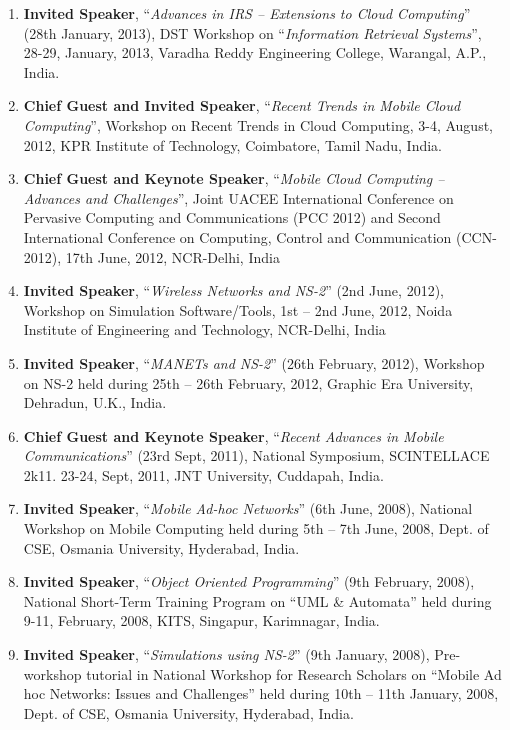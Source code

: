 \begin{enumerate} [label=(T\arabic*).]
\item
\textbf{Invited Speaker}, “\textit{Advances in IRS – Extensions to Cloud Computing}” (28th January, 2013), DST Workshop on “\textit{Information Retrieval Systems}”, 28-29, January, 2013, Varadha Reddy Engineering College, Warangal, A.P., India.

\item
\textbf{Chief Guest and Invited Speaker}, “\textit{Recent Trends in Mobile Cloud Computing}”, Workshop on Recent Trends in Cloud Computing, 3-4, August, 2012, KPR Institute of Technology, Coimbatore, Tamil Nadu, India.

\item
\textbf{Chief Guest and Keynote Speaker}, “\textit{Mobile Cloud Computing – Advances and Challenges}”, Joint UACEE International Conference on Pervasive Computing and Communications (PCC 2012) and Second International Conference on Computing, Control and Communication (CCN-2012), 17th June, 2012, NCR-Delhi, India

\item
\textbf{Invited Speaker}, “\textit{Wireless Networks and NS-2}” (2nd June, 2012), Workshop on Simulation Software/Tools, 1st – 2nd June, 2012, Noida Institute of Engineering and Technology, NCR-Delhi, India

\item
\textbf{Invited Speaker}, “\textit{MANETs and NS-2}” (26th February, 2012), Workshop on NS-2 held during 25th – 26th February, 2012, Graphic Era University, Dehradun, U.K., India.

\item
\textbf{Chief Guest and Keynote Speaker}, “\textit{Recent Advances in Mobile Communications}” (23rd Sept, 2011), National Symposium, SCINTELLACE 2k11. 23-24, Sept, 2011, JNT University, Cuddapah, India.

\item
\textbf{Invited Speaker}, “\textit{Mobile Ad-hoc Networks}” (6th June, 2008), National Workshop on Mobile Computing held during 5th – 7th June, 2008, Dept. of CSE, Osmania University, Hyderabad, India.

\item
\textbf{Invited Speaker}, “\textit{Object Oriented Programming}” (9th February, 2008), National Short-Term Training Program on “UML \& Automata” held during   9-11, February, 2008, KITS, Singapur, Karimnagar, India.

\item
\textbf{Invited Speaker}, “\textit{Simulations using NS-2}” (9th January, 2008), Pre-workshop tutorial in National Workshop for Research Scholars on “Mobile Ad hoc Networks: Issues and Challenges” held during 10th – 11th January, 2008, Dept. of CSE, Osmania University, Hyderabad, India.


\end{enumerate}
